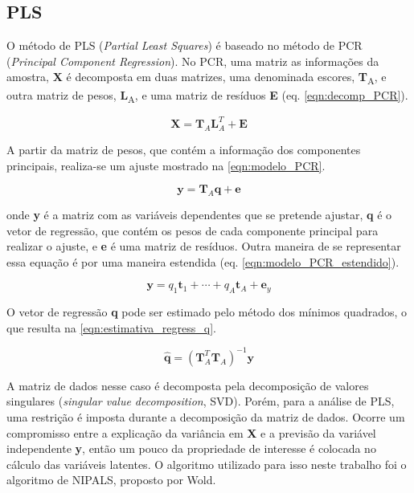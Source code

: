 		\subsection{PLS}
		
		O método de PLS (\emph{Partial Least Squares}) é baseado no método de PCR (\emph{Principal Component Regression}). No PCR, uma matriz as informações da amostra, \textbf{X} é decomposta em duas matrizes, uma denominada escores, \textbf{T}\textsubscript{A}, e outra matriz de pesos, \textbf{L}\textsubscript{A}, e uma matriz de resíduos \textbf{E} (eq. \ref{eqn:decomp_PCR}).
		
		\begin{equation}
			\mathbf{X} = \mathbf{T}_A \mathbf{L}_A^T + \mathbf{E}
			\label{eqn:decomp_PCR}
		\end{equation}
		
		A partir da matriz de pesos, que contém a informação dos componentes principais, realiza-se um ajuste mostrado na \autoref{eqn:modelo_PCR}.
		
		\begin{equation}
			\mathbf{y} = \mathbf{T}_A\mathbf{q} + \mathbf{e}
			\label{eqn:modelo_PCR}
		\end{equation}
		
		\noindent onde \textbf{y} é a matriz com as variáveis dependentes que se pretende ajustar, \textbf{q} é o vetor de regressão, que contém os pesos de cada componente principal para realizar o ajuste, e \textbf{e} é uma matriz de resíduos. Outra maneira de se representar essa equação é por uma maneira estendida (eq. \ref{eqn:modelo_PCR_estendido}).
		
		\begin{equation}
			\mathbf{y} = q_1\mathbf{t}_1 + \cdots + q_A\mathbf{t}_A + \mathbf{e}_y
			\label{eqn:modelo_PCR_estendido}
		\end{equation}
		
		O vetor de regressão \textbf{q} pode ser estimado pelo método dos mínimos quadrados, o que resulta na \autoref{eqn:estimativa_regress_q}.
		
		\begin{equation}
			\hat{\textbf{q}} = \left(  \mathbf{T}_A^T \mathbf{T}_A  \right)^{-1}\mathbf{y}
			\label{eqn:estimativa_regress_q}
		\end{equation}

		A matriz de dados nesse caso é decomposta pela decomposição de valores singulares (\emph{singular value decomposition}, SVD). Porém, para a análise de PLS, uma restrição é imposta durante a decomposição da matriz de dados. Ocorre um compromisso entre a explicação da variância em \textbf{X} e a previsão da variável independente \textbf{y}, então um pouco da propriedade de interesse é colocada no cálculo das variáveis latentes. O algoritmo utilizado para isso neste trabalho foi o algoritmo de NIPALS, proposto por Wold.
		
